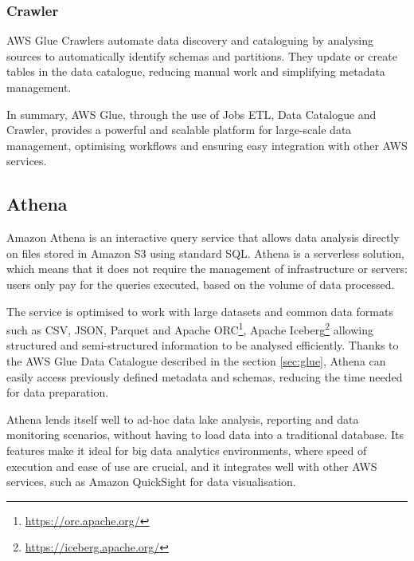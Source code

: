 \subsubsection{Crawler}
\ac{AWS} Glue Crawlers automate data discovery and cataloguing by analysing sources to automatically identify schemas and partitions. They update or create tables in the data catalogue, reducing manual work and simplifying metadata management.

In summary, \ac{AWS} Glue, through the use of Jobs \ac{ETL}, Data Catalogue and Crawler, provides a powerful and scalable platform for large-scale data management, optimising workflows and ensuring easy integration with other \ac{AWS} services.
\subsection{Athena}
Amazon Athena is an interactive query service that allows data analysis directly on files stored in Amazon \ac{S3} using standard \ac{SQL}. Athena is a serverless solution, which means that it does not require the management of infrastructure or servers: users only pay for the queries executed, based on the volume of data processed.

The service is optimised to work with large datasets and common data formats such as \ac{CSV}, \ac{JSON}, Parquet and Apache ORC\footnote{\url{https://orc.apache.org/}}, Apache Iceberg\footnote{\url{https://iceberg.apache.org/}} allowing structured and semi-structured information to be analysed efficiently. Thanks to the \ac{AWS} Glue Data Catalogue described in the section \ref{sec:glue}, Athena can easily access previously defined metadata and schemas, reducing the time needed for data preparation.

Athena lends itself well to ad-hoc data lake analysis, reporting and data monitoring scenarios, without having to load data into a traditional database. Its features make it ideal for big data analytics environments, where speed of execution and ease of use are crucial, and it integrates well with other \ac{AWS} services, such as Amazon QuickSight for data visualisation.

